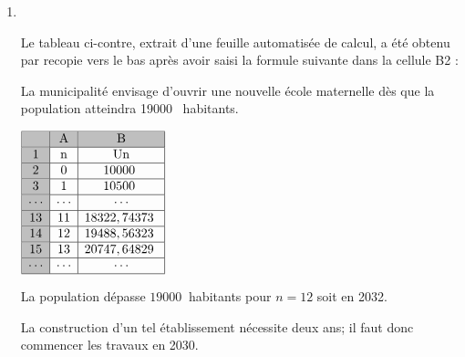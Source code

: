 \documentclass[10pt]{article}
\providecommand{\np}[2][]{{#2~#1}}
\begin{document}
\begin{enumerate}
\item ~

\begin{minipage}{0.66\linewidth}
Le tableau ci-contre, extrait d'une feuille automatisée de calcul, a été obtenu par recopie vers le bas après avoir saisi la formule suivante dans la cellule B2 :

\begin{center}
\end{center}

La municipalité envisage d'ouvrir une nouvelle école
 maternelle dès que la population atteindra \np{19000} habitants.\\

\end{minipage}
\hfill
\begin{minipage}{0.3\linewidth}
$\begin{array}{|>{\cellcolor{lightgray}}c|c|c|}\hline
\rowcolor{lightgray}&\text{A}&\text{B}\\ \hline
1&\text{n}& \text{Un}\\ \hline
2&0&\np{10000}\\ \hline
3&1&\np{10500}\\ \hline
\cdots & \cdots & \cdots \\ \hline
13&11&\np{18322,74373}\\ \hline
14&12&\np{19488,56323}\\ \hline
15&13&\np{20747,64829}\\ \hline
\cdots & \cdots & \cdots \\ \hline
\end{array}$
\end{minipage}

\medskip

La population dépasse $\np{19000}$ habitants pour $n=12$ soit en 2032.

La construction d'un tel établissement nécessite deux ans; il faut donc commencer les travaux en 2030.

\end{enumerate}

\bigskip
\end{document}
